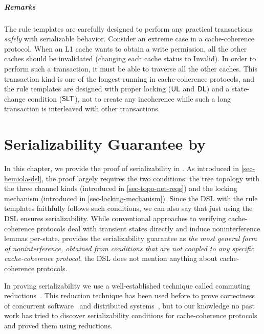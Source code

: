 \paragraph{Remarks}

The rule templates are carefully designed to perform any practical transactions \emph{safely} with serializable behavior.
Consider an extreme case in a cache-coherence protocol.
When an L1 cache wants to obtain a write permission, all the other caches should be invalidated (changing each cache status to Invalid).
In order to perform such a transaction, it must be able to traverse all the other caches.
This transaction kind is one of the longest-running in cache-coherence protocols, and the rule templates are designed with proper locking ($\textsf{UL}$ and $\textsf{DL}$) and a state-change condition ($\textsf{SLT}$), not to create any incoherence while such a long transaction is interleaved with other transactions.

\chapter{Serializability Guarantee by \hemiola{}}

In this chapter, we provide the proof of serializability in \hemiola{}.
As introduced in \autoref{sec-hemiola-dsl}, the proof largely requires the two conditions: the tree topology with the three channel kinds (introduced in \autoref{sec-topo-net-reqs}) and the locking mechanism (introduced in \autoref{sec-locking-mechanism}).
Since the \hemiola{} DSL with the rule templates faithfully follows such conditions, we can also say that just using the DSL ensures serializability.
While conventional approaches to verifying cache-coherence protocols deal with transient states directly and induce noninterference lemmas per-state, \hemiola{} provides the serializability guarantee as \emph{the most general form of noninterference, obtained from conditions that are not coupled to any specific cache-coherence protocol}, \eg{} the DSL does not mention anything about cache-coherence protocols.

In proving serializability we use a well-established technique called commuting reductions~\cite{reduction}.
This reduction technique has been used before to prove correctness of concurrent software~\cite{Chajed:2018} and distributed systems~\cite{Hawblitzel:2015,Hawblitzel:2017}, but to our knowledge no past work has tried to discover serializability conditions for cache-coherence protocols and proved them using reductions.

